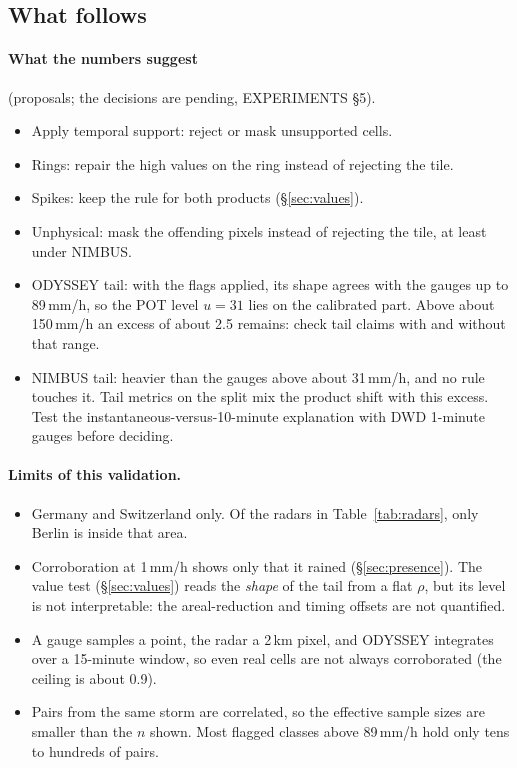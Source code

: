 \documentclass[11pt,a4paper]{article}
\theoremstyle{definition}
\theoremstyle{remark}
\newcommand{\1}{\mathbf{1}}
\newcommand{\code}[1]{\texttt{\detokenize{#1}}}
\begin{document}
\subsection{What follows}

\paragraph{What the numbers suggest} (proposals; the decisions are pending, EXPERIMENTS \S5).
\begin{itemize}[nosep]
\item Apply temporal support: reject or mask unsupported cells.
\item Rings: repair the high values on the ring instead of rejecting the tile.
\item Spikes: keep the rule for both products (\S\ref{sec:values}).
\item Unphysical: mask the offending pixels instead of rejecting the tile, at least under
  NIMBUS.
\item ODYSSEY tail: with the flags applied, its shape agrees with the gauges up to
  89\,mm/h, so the POT level $u=31$ lies on the calibrated part. Above about 150\,mm/h an
  excess of about 2.5 remains: check tail claims with and without that range.
\item NIMBUS tail: heavier than the gauges above about 31\,mm/h, and no rule touches it.
  Tail metrics on the \code{nimbus} split mix the product shift with this excess. Test the
  instantaneous-versus-10-minute explanation with DWD 1-minute gauges before deciding.
\end{itemize}

\paragraph{Limits of this validation.}
\begin{itemize}[nosep]
\item Germany and Switzerland only. Of the radars in Table~\ref{tab:radars}, only Berlin is
  inside that area.
\item Corroboration at 1\,mm/h shows only that it rained (\S\ref{sec:presence}). The value
  test (\S\ref{sec:values}) reads the \emph{shape} of the tail from a flat $\rho$, but its
  level is not interpretable: the areal-reduction and timing offsets are not quantified.
\item A gauge samples a point, the radar a 2\,km pixel, and ODYSSEY integrates over a
  15-minute window, so even real cells are not always corroborated (the ceiling is about 0.9).
\item Pairs from the same storm are correlated, so the effective sample sizes are smaller than
  the $n$ shown. Most flagged classes above 89\,mm/h hold only tens to hundreds of pairs.
\end{itemize}
\end{document}
